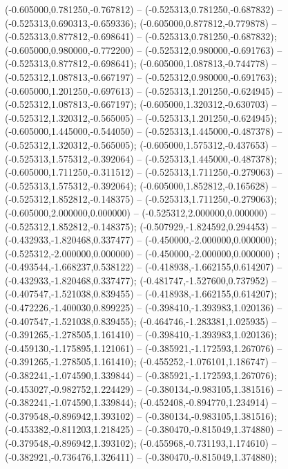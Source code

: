  (-0.605000,0.781250,-0.767812) -- (-0.525313,0.781250,-0.687832) -- (-0.525313,0.690313,-0.659336);
 (-0.605000,0.877812,-0.779878) -- (-0.525313,0.877812,-0.698641) -- (-0.525313,0.781250,-0.687832);
 (-0.605000,0.980000,-0.772200) -- (-0.525312,0.980000,-0.691763) -- (-0.525313,0.877812,-0.698641);
 (-0.605000,1.087813,-0.744778) -- (-0.525312,1.087813,-0.667197) -- (-0.525312,0.980000,-0.691763);
 (-0.605000,1.201250,-0.697613) -- (-0.525313,1.201250,-0.624945) -- (-0.525312,1.087813,-0.667197);
 (-0.605000,1.320312,-0.630703) -- (-0.525312,1.320312,-0.565005) -- (-0.525313,1.201250,-0.624945);
 (-0.605000,1.445000,-0.544050) -- (-0.525313,1.445000,-0.487378) -- (-0.525312,1.320312,-0.565005);
 (-0.605000,1.575312,-0.437653) -- (-0.525313,1.575312,-0.392064) -- (-0.525313,1.445000,-0.487378);
 (-0.605000,1.711250,-0.311512) -- (-0.525313,1.711250,-0.279063) -- (-0.525313,1.575312,-0.392064);
 (-0.605000,1.852812,-0.165628) -- (-0.525312,1.852812,-0.148375) -- (-0.525313,1.711250,-0.279063);
 (-0.605000,2.000000,0.000000) -- (-0.525312,2.000000,0.000000) -- (-0.525312,1.852812,-0.148375);
 (-0.507929,-1.824592,0.294453) -- (-0.432933,-1.820468,0.337477) -- (-0.450000,-2.000000,0.000000);
 (-0.525312,-2.000000,0.000000) -- (-0.450000,-2.000000,0.000000) ;
 (-0.493544,-1.668237,0.538122) -- (-0.418938,-1.662155,0.614207) -- (-0.432933,-1.820468,0.337477);
 (-0.481747,-1.527600,0.737952) -- (-0.407547,-1.521038,0.839455) -- (-0.418938,-1.662155,0.614207);
 (-0.472226,-1.400030,0.899225) -- (-0.398410,-1.393983,1.020136) -- (-0.407547,-1.521038,0.839455);
 (-0.464746,-1.283381,1.025935) -- (-0.391265,-1.278505,1.161410) -- (-0.398410,-1.393983,1.020136);
 (-0.459130,-1.175895,1.121061) -- (-0.385921,-1.172593,1.267076) -- (-0.391265,-1.278505,1.161410);
 (-0.455252,-1.076101,1.186747) -- (-0.382241,-1.074590,1.339844) -- (-0.385921,-1.172593,1.267076);
 (-0.453027,-0.982752,1.224429) -- (-0.380134,-0.983105,1.381516) -- (-0.382241,-1.074590,1.339844);
 (-0.452408,-0.894770,1.234914) -- (-0.379548,-0.896942,1.393102) -- (-0.380134,-0.983105,1.381516);
 (-0.453382,-0.811203,1.218425) -- (-0.380470,-0.815049,1.374880) -- (-0.379548,-0.896942,1.393102);
 (-0.455968,-0.731193,1.174610) -- (-0.382921,-0.736476,1.326411) -- (-0.380470,-0.815049,1.374880);
